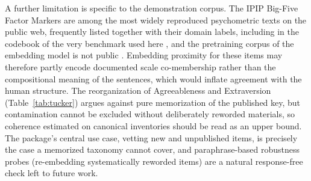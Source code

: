 A further limitation is specific to the demonstration corpus. The IPIP
Big-Five Factor Markers are among the most widely reproduced psychometric
texts on the public web, frequently listed together with their domain
labels, including in the codebook of the very benchmark used here
\citep{openpsychometrics-2018}, and the pretraining corpus of the
embedding model is not public \citep{qwen-2025}. Embedding proximity for
these items may therefore partly encode documented scale co-membership
rather than the compositional meaning of the sentences, which would
inflate agreement with the human structure. The reorganization of
Agreeableness and Extraversion (Table~\ref{tab:tucker}) argues against
pure memorization of the published key, but contamination cannot be
excluded without deliberately reworded materials, so coherence estimated
on canonical inventories should be read as an upper bound. The package's
central use case, vetting new and unpublished items, is precisely the
case a memorized taxonomy cannot cover, and paraphrase-based robustness
probes (re-embedding systematically reworded items) are a natural
response-free check left to future work.

